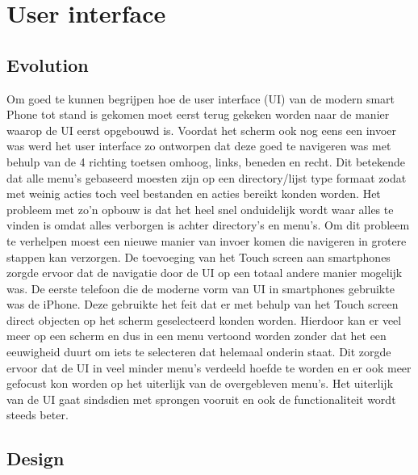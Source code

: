 \chapter{User interface}

\section{Evolution}

Om goed te kunnen begrijpen hoe de user interface (UI) van de modern smart Phone tot stand is gekomen moet eerst terug gekeken worden naar de manier waarop de UI eerst opgebouwd is. Voordat het scherm ook nog eens een invoer was werd het user interface zo ontworpen dat deze goed te navigeren was met behulp van de 4 richting toetsen omhoog, links, beneden en recht. Dit betekende dat alle menu’s gebaseerd moesten zijn op een directory/lijst type formaat zodat met weinig acties toch veel bestanden en acties bereikt konden worden. Het probleem met zo’n opbouw is dat het heel snel onduidelijk wordt waar alles te vinden is omdat alles verborgen is achter directory’s en menu’s. Om dit probleem te verhelpen moest een nieuwe manier van invoer komen die navigeren in grotere stappen kan verzorgen. De toevoeging van het Touch screen aan smartphones zorgde ervoor dat de navigatie door de UI op een totaal andere manier mogelijk was. De eerste telefoon die de moderne vorm van UI in smartphones gebruikte was de iPhone. Deze gebruikte het feit dat er met behulp van het Touch screen direct objecten op het scherm geselecteerd konden worden. Hierdoor kan er veel meer op een scherm en dus in een menu vertoond worden zonder dat het een eeuwigheid duurt om iets te selecteren dat helemaal onderin staat. Dit zorgde ervoor dat de UI in veel minder menu’s verdeeld hoefde te worden en er ook meer gefocust kon worden op het uiterlijk van de overgebleven menu’s. Het uiterlijk van de UI gaat sindsdien met sprongen vooruit en ook de functionaliteit wordt steeds beter.

\section{Design}

